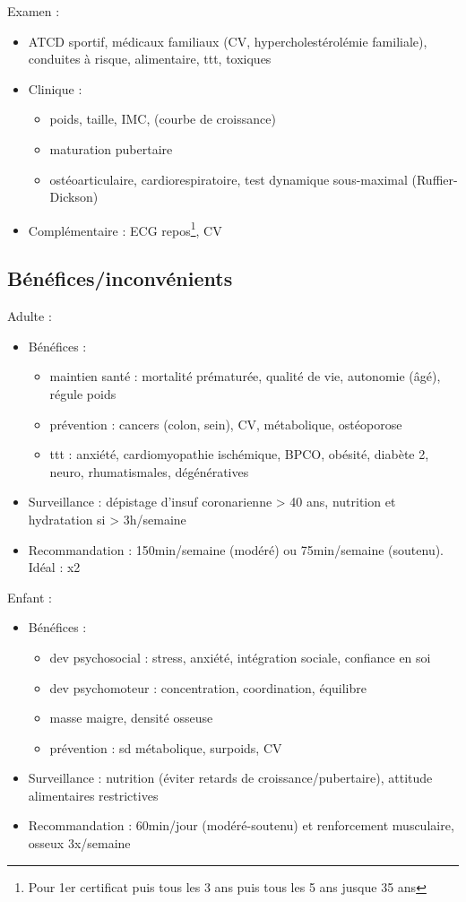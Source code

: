 \documentclass{book}
\begin{document}
Examen :
\begin{itemize}
\item ATCD sportif, médicaux familiaux (CV, hypercholestérolémie familiale),
conduites à risque, alimentaire, ttt, toxiques
\item Clinique : 
\begin{itemize}
\item poids, taille, IMC, (courbe de croissance)
\item maturation pubertaire
\item ostéoarticulaire, cardiorespiratoire, test dynamique sous-maximal
(Ruffier-Dickson)
\end{itemize}
\item Complémentaire : ECG repos\footnote{Pour 1er certificat puis tous les 3 ans puis tous les 5
ans jusque 35 ans}, CV
\end{itemize}

\subsection{Bénéfices/inconvénients}
\label{sec:orgb3d1430}
Adulte :
\begin{itemize}
\item Bénéfices :
\begin{itemize}
\item maintien santé : \dec mortalité prématurée, \inc qualité de vie, \inc
autonomie (âgé), régule poids
\item prévention : cancers (colon, sein), CV, métabolique, ostéoporose \female
\item ttt : anxiété, cardiomyopathie ischémique, BPCO, obésité, diabète 2, neuro,
rhumatismales, dégénératives
\end{itemize}
\item Surveillance : dépistage d'insuf coronarienne > 40 ans, \danger nutrition et
hydratation si > 3h/semaine
\item Recommandation : 150min/semaine (modéré) ou 75min/semaine (soutenu). Idéal : x2
\end{itemize}

Enfant : 
\begin{itemize}
\item Bénéfices :
\begin{itemize}
\item dev psychosocial : \dec stress, anxiété, \inc intégration sociale, \inc
confiance en soi
\item dev psychomoteur : concentration, coordination, équilibre
\item \inc masse maigre, \inc densité osseuse
\item prévention : sd métabolique, surpoids, CV
\end{itemize}
\item Surveillance : nutrition (éviter retards de croissance/pubertaire), attitude
alimentaires restrictives
\item Recommandation : 60min/jour (modéré-soutenu) et renforcement musculaire,
osseux 3x/semaine
\end{itemize}
\end{document}
